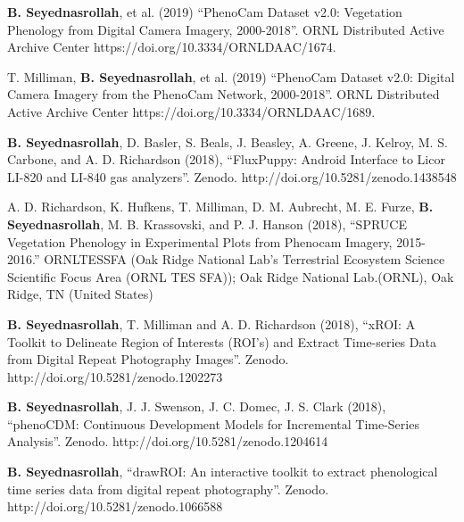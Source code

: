\documentclass[10pt]{article}
\newenvironment{changemargin}[2]{%
  \begin{list}{}{%
 \setlength{\topsep}{0pt}%
 \setlength{\leftmargin}{#1}%
 \setlength{\rightmargin}{#2}%
 \setlength{\listparindent}{\parindent}%
 \setlength{\itemindent}{\parindent}%
 \setlength{\parsep}{\parskip}%
  }%
  \item[]}{\end{list}
}
\newenvironment{body} {
  \vspace*{-2pt}
  \begin{changemargin}{-0.5in}{-0.5in}
}
{\end{changemargin}
}
\begin{document}
\begin{body}
  \begin{etaremune}

    \item  \textbf{B. Seyednasrollah}, et al. (2019) ``PhenoCam Dataset v2.0: Vegetation Phenology from Digital Camera Imagery, 2000-2018''.  ORNL Distributed Active Archive Center https://doi.org/10.3334/ORNLDAAC/1674. \\
    \medskip

    \item T. Milliman, \textbf{B. Seyednasrollah}, et al. (2019) ``PhenoCam Dataset v2.0: Digital Camera Imagery from the PhenoCam Network, 2000-2018''. ORNL Distributed Active Archive Center https://doi.org/10.3334/ORNLDAAC/1689. \\
    \medskip

    \item \textbf{B. Seyednasrollah}, D. Basler, S. Beals, J. Beasley, A. Greene, J. Kelroy, M. S. Carbone, and A. D. Richardson (2018), ``FluxPuppy: Android Interface to Licor LI-820 and LI-840 gas analyzers''. Zenodo. http://doi.org/10.5281/zenodo.1438548\\
    \medskip

    \item A. D. Richardson, K. Hufkens, T. Milliman, D. M. Aubrecht, M. E. Furze, \textbf{B. Seyednasrollah}, M. B. Krassovski, and P. J. Hanson (2018), ``SPRUCE Vegetation Phenology in Experimental Plots from Phenocam Imagery, 2015-2016.'' ORNLTESSFA (Oak Ridge National Lab's Terrestrial Ecosystem Science Scientific Focus Area (ORNL TES SFA)); Oak Ridge National Lab.(ORNL), Oak Ridge, TN (United States)\\
    \medskip

    \item \textbf{B. Seyednasrollah}, T. Milliman and A. D. Richardson (2018),  ``xROI: A Toolkit to Delineate Region of Interests (ROI's) and Extract Time-series Data from Digital Repeat Photography Images''. Zenodo. http://doi.org/10.5281/zenodo.1202273\\
    \medskip

    \item \textbf{B. Seyednasrollah}, J. J. Swenson, J. C. Domec, J. S. Clark (2018),  ``phenoCDM: Continuous Development Models for Incremental Time-Series Analysis''. Zenodo. http://doi.org/10.5281/zenodo.1204614\\
    \medskip

    \item \textbf{B. Seyednasrollah},  ``drawROI: An interactive toolkit to extract phenological time series data from digital repeat photography''. Zenodo. http://doi.org/10.5281/zenodo.1066588\\
    \medskip


\end{etaremune}
\end{body}
\end{document}
